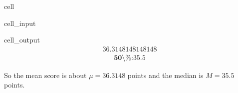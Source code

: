 \documentclass[letterpaper,10pt,english]{jupyterBook}
\begin{document}
\begin{sphinxuseclass}{cell}\begin{sphinxVerbatimInput}

\begin{sphinxuseclass}{cell_input}
\begin{sphinxVerbatim}[commandchars=\\\{\}]



\end{sphinxVerbatim}

\end{sphinxuseclass}\end{sphinxVerbatimInput}
\begin{sphinxVerbatimOutput}

\begin{sphinxuseclass}{cell_output}\begin{equation*}
\begin{split}36.3148148148148\end{split}
\end{equation*}\begin{equation*}
\begin{split}\textbf{50\textbackslash{}\%:} 35.5\end{split}
\end{equation*}
\end{sphinxuseclass}\end{sphinxVerbatimOutput}

\end{sphinxuseclass}
\sphinxAtStartPar
So the mean score is about \(\mu = 36.3148\) points and the median is \(M = 35.5\) points.
\end{document}
